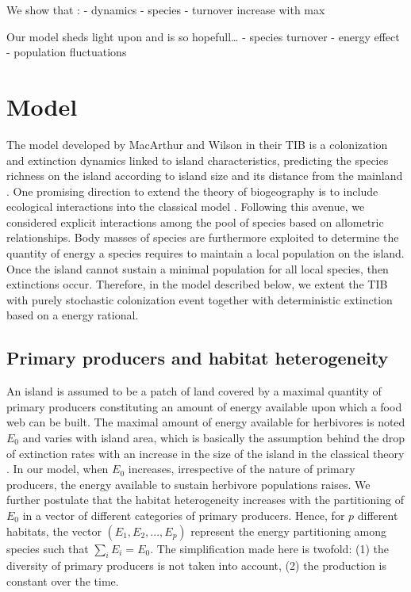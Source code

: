 We show that : - dynamics - species - turnover increase with max

Our model sheds light upon and is so hopefull\ldots{} - species turnover
- energy effect - population fluctuations

\section{Model}\label{model}

The model developed by MacArthur and Wilson in their TIB is a
colonization and extinction dynamics linked to island characteristics,
predicting the species richness on the island according to island size
and its distance from the mainland \citep{MacArthur1967}. One promising
direction to extend the theory of biogeography is to include ecological
interactions into the classical model
\citep{Holt2010, Gravel2011, Cazelles2015a}. Following this avenue, we
considered explicit interactions among the pool of species based on
allometric relationships. Body masses of species are furthermore
exploited to determine the quantity of energy a species requires to
maintain a local population on the island. Once the island cannot
sustain a minimal population for all local species, then extinctions
occur. Therefore, in the model described below, we extent the TIB with
purely stochastic colonization event together with deterministic
extinction based on a energy rational.

\subsection{Primary producers and habitat
heterogeneity}\label{primary-producers-and-habitat-heterogeneity}

An island is assumed to be a patch of land covered by a maximal quantity
of primary producers constituting an amount of energy available upon
which a food web can be built. The maximal amount of energy available
for herbivores is noted \(E_0\) and varies with island area, which is
basically the assumption behind the drop of extinction rates with an
increase in the size of the island in the classical theory
\citep{MacArthur1967, Rabosky2015}. In our model, when \(E_0\)
increases, irrespective of the nature of primary producers, the energy
available to sustain herbivore populations raises. We further postulate
that the habitat heterogeneity increases with the partitioning of
\(E_0\) in a vector of different categories of primary producers. Hence,
for \(p\) different habitats, the vector \((E_1, E_2, ..., E_p)\)
represent the energy partitioning among species such that
\(\sum_i E_i=E_0\). The simplification made here is twofold: (1) the
diversity of primary producers is not taken into account, (2) the
production is constant over the time.

